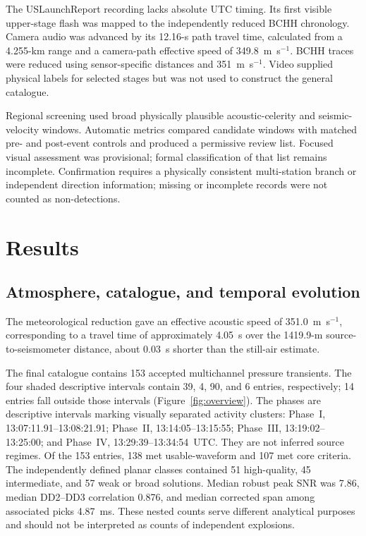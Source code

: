 \documentclass[]{seismica}
\begin{document}
The USLaunchReport recording lacks absolute UTC timing. Its first visible upper-stage
flash was mapped to the independently reduced BCHH chronology. Camera audio
was advanced by its 12.16-s path travel time, calculated from a 4.255-km range
and a camera-path effective speed of 349.8~m~s$^{-1}$. BCHH traces were reduced
using sensor-specific distances and 351~m~s$^{-1}$. Video supplied physical
labels for selected stages but was not used to construct the general catalogue.

Regional screening used broad physically plausible acoustic-celerity and
seismic-velocity windows. Automatic metrics compared candidate windows with matched pre- and post-event
controls and produced a permissive review list. Focused visual assessment
was provisional; formal classification of that list remains incomplete.
Confirmation requires a physically consistent multi-station branch or
independent direction information; missing or incomplete records were not
counted as non-detections.

\section{Results}
\label{sec:results}

\subsection{Atmosphere, catalogue, and temporal evolution}
\label{sec:temporal_evolution}

The meteorological reduction gave an effective acoustic speed of
351.0~m~s$^{-1}$, corresponding to a travel time of approximately 4.05~s over
the 1419.9-m source-to-seismometer distance, about 0.03~s shorter than the
still-air estimate.

The final catalogue contains 153 accepted multichannel pressure transients.
The four shaded descriptive intervals contain 39, 4, 90, and 6 entries,
respectively; 14 entries fall outside those intervals
(Figure~\ref{fig:overview}). The phases are descriptive intervals marking
visually separated activity clusters: Phase~I, 13:07:11.91--13:08:21.91;
Phase~II, 13:14:05--13:15:55; Phase~III, 13:19:02--13:25:00; and Phase~IV,
13:29:39--13:34:54~UTC. They are not inferred source regimes. Of the 153
entries, 138 met usable-waveform and 107 met core
criteria. The independently defined planar classes contained 51 high-quality,
45 intermediate, and 57 weak or broad solutions. Median robust peak SNR was
7.86, median DD2--DD3 correlation 0.876, and median corrected span among
associated picks 4.87~ms. These nested counts serve different analytical
purposes and should not be interpreted as counts of independent explosions.
\end{document}
